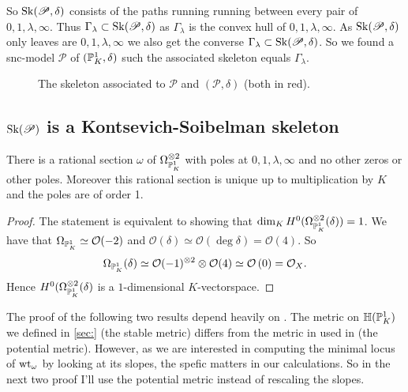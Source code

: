 So $\operatorname{Sk}(\mathscr P, \delta)$ consists of the paths running running between every pair of $0, 1, \lambda, \infty$. Thus $\Gamma_\lambda \subset \operatorname{Sk}(\mathscr P, \delta)$ as $\Gamma_\lambda$ is the convex hull of $0, 1, \lambda, \infty$.
As $\operatorname{Sk}(\mathscr P, \delta)$ only leaves are $0, 1, \lambda, \infty$ we also get the converse $\Gamma_\lambda \subset  \operatorname{Sk}(\mathscr P, \delta)$. 
So we found a snc-model $\mathscr P$ of $(\mathbb{P}^{1}_K, \delta)$ such the associated skeleton equals $\Gamma_\lambda$. 

\begin{figure}[ht]
    \centering
    \caption{The skeleton associated to $\mathscr P$ and $(\mathscr P, \delta)$ (both in red).}
    \label{fig:skeleton_of_the_pair}
\end{figure}

\subsection{$\operatorname{Sk}(\mathscr P)$ is a Kontsevich-Soibelman skeleton} \label{sec:$\sk(\mathscr_p)$_is_a_kontsevich-soibelman_skeleton}

\begin{lemma}\label{lem:unique_form_pair}
	There is a rational section $\omega$ of $\Omega_{\mathbb{P}^{1}_K}^{\otimes 2}$ with poles at  $0, 1, \lambda, \infty$ and no other zeros or other poles. 
	Moreover this rational section is unique up to multiplication by $K$ and the poles are of order 1. 
\end{lemma}
\begin{proof}
	The statement is equivalent to showing that $\dim_K H^{0}(\Omega_{\mathbb{P}^{1}_K}^{\otimes 2}(\delta))  = 1$.
	We have that $\Omega_{\mathbb{P}^{1}_K} \simeq \mathcal{O}(-2)$ and $\mathcal{O}(\delta) \simeq \mathcal{O}(\deg \delta) = \mathcal{O}(4)$.
	So \[
		\Omega_{\mathbb{P}^{1}_K} (\delta) \simeq \mathcal{O}(-1)^{\otimes 2} \otimes \mathcal{O}(4) \simeq \mathcal{O}\left(0 \right)  = \mathcal{O}_X
	.\] 
	Hence $H^{0}(\Omega_{\mathbb{P}^{1}_K}^{\otimes 2}(\delta)$ is a $1$-dimensional $K$-vectorspace. 
\end{proof}

The proof of the following two results depend heavily on \cite[thm.\ 3.2.3]{bakerWeightFunctionsBerkovich2016}. 
	The metric on $\mathbb{H}(\mathbb{P}^{1}_K)$ we defined in \cref{sec:} (the stable metric) differs from the metric in used in \cite{bakerWeightFunctionsBerkovich2016} (the potential metric). 
	However, as we are interested in computing the minimal locus of $\operatorname{wt}_\omega$ by looking at its slopes, the spefic matters in our calculations. 
	So in the next two proof I'll use the potential metric instead of rescaling the slopes.

